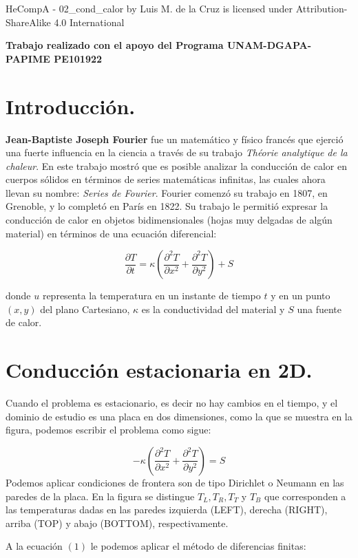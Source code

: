 \documentclass[
  letterpaper,
  DIV=11,
  numbers=noendperiod]{scrreprt}
\begin{document}
HeCompA - 02\_cond\_calor by Luis M. de la Cruz is licensed under
Attribution-ShareAlike 4.0 International

\textbf{Trabajo realizado con el apoyo del Programa UNAM-DGAPA-PAPIME
PE101922}

\section{Introducción.}\label{introducciuxf3n.}

\textbf{Jean-Baptiste Joseph Fourier} fue un matemático y físico francés
que ejerció una fuerte influencia en la ciencia a través de su trabajo
\emph{Théorie analytique de la chaleur}. En este trabajo mostró que es
posible analizar la conducción de calor en cuerpos sólidos en términos
de series matemáticas infinitas, las cuales ahora llevan su nombre:
\emph{Series de Fourier}. Fourier comenzó su trabajo en 1807, en
Grenoble, y lo completó en París en 1822. Su trabajo le permitió
expresar la conducción de calor en objetos bidimensionales (hojas muy
delgadas de algún material) en términos de una ecuación diferencial:

\[
\dfrac{\partial T}{ \partial t} = \kappa \left(\dfrac{\partial^2 T}{ \partial x^2} + \dfrac{\partial^2 T}{ \partial y^2}\right) + S
\]

donde \(u\) representa la temperatura en un instante de tiempo \(t\) y
en un punto \((x,y)\) del plano Cartesiano, \(\kappa\) es la
conductividad del material y \(S\) una fuente de calor.

\section{Conducción estacionaria en
2D.}\label{conducciuxf3n-estacionaria-en-2d.}

Cuando el problema es estacionario, es decir no hay cambios en el
tiempo, y el dominio de estudio es una placa en dos dimensiones, como la
que se muestra en la figura, podemos escribir el problema como sigue:

\[
- \kappa \left(\dfrac{\partial^2 T}{ \partial x^2} + \dfrac{\partial^2 T}{ \partial y^2}\right) = S \tag{1}
\] Podemos aplicar condiciones de frontera son de tipo Dirichlet o
Neumann en las paredes de la placa. En la figura se distingue
\(T_L, T_R, T_T\) y \(T_B\) que corresponden a las temperaturas dadas en
las paredes izquierda (LEFT), derecha (RIGHT), arriba (TOP) y abajo
(BOTTOM), respectivamente.

A la ecuación \((1)\) le podemos aplicar el método de diferencias
finitas:
\end{document}
